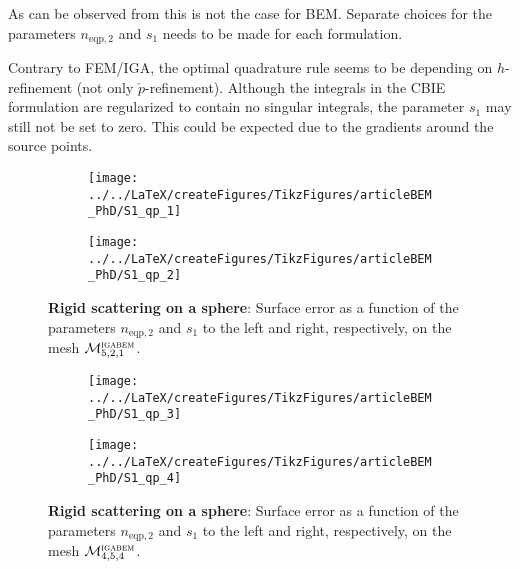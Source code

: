 As can be observed from  this is not the case for BEM. Separate choices for the parameters $n_{\mathrm{eqp},2}$ and $s_1$ needs to be made for each formulation. 

Contrary to FEM/IGA, the optimal quadrature rule seems to be depending on $h$-refinement (not only $\check{p}$-refinement). Although the integrals in the CBIE formulation are regularized to contain no singular integrals, the parameter $s_1$ may still not be set to zero. This could be expected due to the gradients around the source points.

\begin{figure}
	\centering    
	\begin{subfigure}[t]{0.49\textwidth}
		\centering
		\texttt{[image: ../../LaTeX/createFigures/TikzFigures/articleBEM\_PhD/S1\_qp\_1]}
	\end{subfigure}%
	\hspace*{0.02\textwidth}%
	\begin{subfigure}[t]{0.49\textwidth}
		\centering
		\texttt{[image: ../../LaTeX/createFigures/TikzFigures/articleBEM\_PhD/S1\_qp\_2]}
	\end{subfigure}
	\caption{\textbf{Rigid scattering on a sphere}: Surface error as a function of the parameters $n_{\mathrm{eqp},2}$ and $s_1$ to the left and right, respectively, on the mesh ${\cal M}_{5,2,1}^{\textsc{igabem}}$.}
	\label{Fig3:S1_qp_M5p2}
\end{figure}
\begin{figure}
	\centering
	\begin{subfigure}[t]{0.49\textwidth}
		\centering
		\texttt{[image: ../../LaTeX/createFigures/TikzFigures/articleBEM\_PhD/S1\_qp\_3]}
	\end{subfigure}%
	\hspace*{0.02\textwidth}%
	\begin{subfigure}[t]{0.49\textwidth}
		\centering
		\texttt{[image: ../../LaTeX/createFigures/TikzFigures/articleBEM\_PhD/S1\_qp\_4]}
	\end{subfigure}
	\caption{\textbf{Rigid scattering on a sphere}: Surface error as a function of the parameters $n_{\mathrm{eqp},2}$ and $s_1$ to the left and right, respectively, on the mesh ${\cal M}_{4,5,4}^{\textsc{igabem}}$.}
	\label{Fig3:S1_qp_M4p5}
\end{figure}
